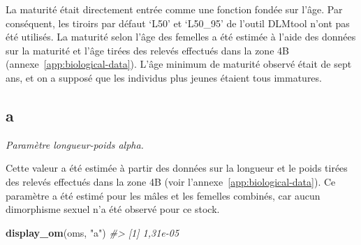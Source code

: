 \documentclass[french,11pt]{book}
\newenvironment{Shaded}{\begin{snugshade}}{\end{snugshade}}
\newcommand{\CommentTok}[1]{\textcolor[rgb]{0.56,0.35,0.01}{\textit{#1}}}
\newcommand{\ControlFlowTok}[1]{\textcolor[rgb]{0.13,0.29,0.53}{\textbf{#1}}}
\newcommand{\DecValTok}[1]{\textcolor[rgb]{0.00,0.00,0.81}{#1}}
\newcommand{\FloatTok}[1]{\textcolor[rgb]{0.00,0.00,0.81}{#1}}
\newcommand{\KeywordTok}[1]{\textcolor[rgb]{0.13,0.29,0.53}{\textbf{#1}}}
\newcommand{\NormalTok}[1]{#1}
\newcommand{\OperatorTok}[1]{\textcolor[rgb]{0.81,0.36,0.00}{\textbf{#1}}}
\newcommand{\StringTok}[1]{\textcolor[rgb]{0.31,0.60,0.02}{#1}}
\begin{document}
La maturité était directement entrée comme une fonction fondée sur l'âge. Par conséquent, les tiroirs par défaut `L50' et `L50\_95' de l'outil DLMtool n'ont pas été utilisés. La maturité selon l'âge des femelles a été estimée à l'aide des données sur la maturité et l'âge tirées des relevés effectués dans la zone 4B (annexe~\ref{app:biological-data}). L'âge minimum de maturité observé était de sept ans, et on a supposé que les individus plus jeunes étaient tous immatures.
\begin{Shaded}
\end{Shaded}
\subsection{a}
\label{app:desc-stock-a-yelloweye}

\emph{Paramètre longueur-poids alpha.}

Cette valeur a été estimée à partir des données sur la longueur et le poids tirées des relevés effectués dans la zone 4B (voir l'annexe~\ref{app:biological-data}). Ce paramètre a été estimé pour les mâles et les femelles combinés, car aucun dimorphisme sexuel n'a été observé pour ce stock.
\begin{Shaded}
\begin{Highlighting}[]
\KeywordTok{display_om}\NormalTok{(oms, }\StringTok{"a"}\NormalTok{)}
\CommentTok{#> [1] 1,31e-05}
\end{Highlighting}
\end{Shaded}
\end{document}

